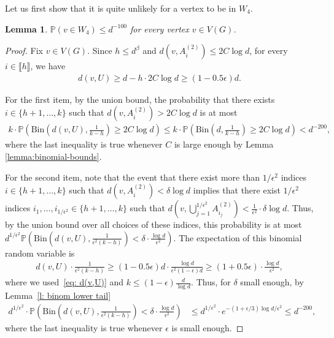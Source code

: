 \documentclass[notitlepage]{scrartcl}
\newcommand{\br}[1]{\llbracket{#1}\rrbracket}
\newtheorem{lemma}[thm]{Lemma}
\renewcommand{\Pr}{\mathbb{P}}
\begin{document}
Let us first show that it is quite unlikely for a vertex to be in $W_4$.
\begin{lemma}\label{l: prob w0}
    $\Pr(v \in W_4) \le d^{-100}$ for every vertex $v \in V(G)$.
\end{lemma}
\begin{proof}
    Fix $v \in V(G)$. Since $h \le d^{\beta}$ and $d(v, A_i^{(2)}) \le 2C \log d$, for every $i \in \br{h}$, we have 
    \begin{align}
           d(v, U) \ge d - h \cdot 2C \log d \ge (1 - 0.5\epsilon)d. \label{eq: d(v,U)}
    \end{align}

    For the first item, by the union bound, the probability that there exists $i \in \{h+1,\ldots,k\}$ such that $d(v, A_i^{(2)}) > 2C \log d$ is at most 
    \begin{align*}
        k \cdot \Pr\left(\text{Bin}\left(d(v, U), \frac{1}{k - h}\right) \ge 2C \log d\right)  \le k\cdot \Pr\left(\text{Bin}\left(d,\frac{1}{k-h}\right)\ge 2C\log d\right)< d^{-200},
    \end{align*}
    where the last inequality is true whenever $C$ is large enough by Lemma \ref{lemma:binomial-bounds}.

    For the second item, note that the event that there exist more than $1 / \epsilon^2$ indices $i \in \{h+1,\ldots,k\}$ such that $d(v, A_i^{(2)}) < \delta \log d$ implies that there exist $1 / \epsilon^2$ indices $i_1, \dots, i_{1/\epsilon^2} \in \{h+1,\ldots,k\}$ such that $d\left(v, \bigcup_{j=1}^{1/\epsilon^2} A_{i_j}^{(2)}\right) < \frac{1}{\epsilon^2} \cdot \delta \log d$. Thus, by the union bound over all choices of these indices, this probability is at most $d^{1/\epsilon^2} \Pr\left(\text{Bin}\left(d(v, U), \frac{1}{\epsilon^2(k-h)}\right) < \delta \cdot \frac{\log d}{\epsilon^2}\right).$
    The expectation of this binomial random variable is 
    \begin{align*}
        d(v, U) \cdot \frac{1}{\epsilon^2(k-h)} \ge (1 - 0.5\epsilon)d \cdot \frac{\log d}{\epsilon^2 (1-\epsilon) d} \ge (1+0.5\epsilon) \cdot \frac{\log d}{\epsilon^2}, 
    \end{align*}
    where we used~\eqref{eq: d(v,U)} %
     and $k \le (1-\epsilon)\frac{d}{\log d}$. Thus, for $\delta$ small enough, by Lemma~\ref{l: binom lower tail}
    \begin{align*}
        d^{1/\epsilon^2} \cdot \Pr\left(\text{Bin}\left(d(v, U), \frac{1}{\epsilon^2(k-h)}\right) < \delta \cdot \frac{\log d}{\epsilon^2}\right)
        &\le d^{1/\epsilon^2}\cdot e^{-(1+\epsilon/3)\log d/\epsilon^2} \le d^{-200},
    \end{align*}
    where the last inequality is true whenever $\epsilon$ is small enough.


\end{proof}
\end{document}
